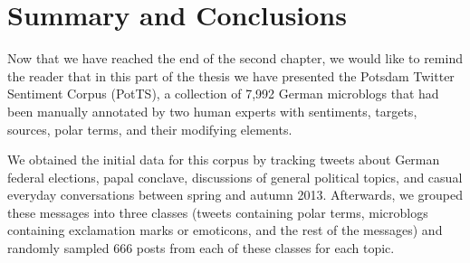 

\section{Summary and Conclusions}

Now that we have reached the end of the second chapter, we would like
to remind the reader that in this part of the thesis we have presented
the Potsdam Twitter Sentiment Corpus (PotTS), a collection of 7,992
German microblogs that had been manually annotated by two human
experts with sentiments, targets, sources, polar terms, and their
modifying elements.

We obtained the initial data for this corpus by tracking tweets about
German federal elections, papal conclave, discussions of general
political topics, and casual everyday conversations between spring and
autumn 2013.  Afterwards, we grouped these messages into three classes
(tweets containing polar terms, microblogs containing exclamation
marks or emoticons, and the rest of the messages) and randomly sampled
666 posts from each of these classes for each topic.


